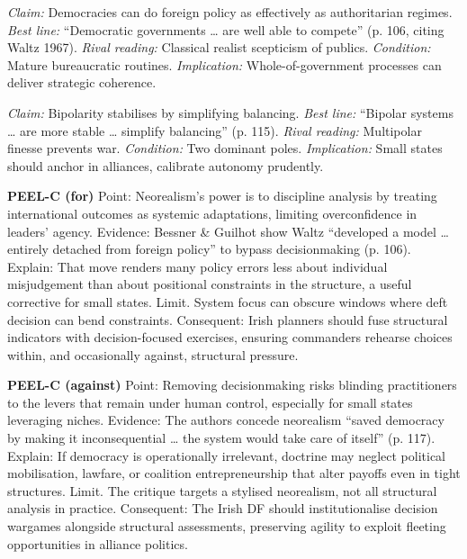 \textit{Claim:} Democracies can do foreign policy as effectively as authoritarian regimes. \textit{Best line:} “Democratic governments … are well able to compete” (p. 106, citing Waltz 1967). \textit{Rival reading:} Classical realist scepticism of publics. \textit{Condition:} Mature bureaucratic routines. \textit{Implication:} Whole-of-government processes can deliver strategic coherence.

\textit{Claim:} Bipolarity stabilises by simplifying balancing. \textit{Best line:} “Bipolar systems … are more stable … simplify balancing” (p. 115). \textit{Rival reading:} Multipolar finesse prevents war. \textit{Condition:} Two dominant poles. \textit{Implication:} Small states should anchor in alliances, calibrate autonomy prudently.

\textbf{PEEL-C (for)}
Point: Neorealism’s power is to discipline analysis by treating international outcomes as systemic adaptations, limiting overconfidence in leaders’ agency.
Evidence: Bessner \& Guilhot show Waltz “developed a model … entirely detached from foreign policy” to bypass decisionmaking (p. 106).
Explain: That move renders many policy errors less about individual misjudgement than about positional constraints in the structure, a useful corrective for small states.
Limit. System focus can obscure windows where deft decision can bend constraints.
Consequent: Irish planners should fuse structural indicators with decision-focused exercises, ensuring commanders rehearse choices within, and occasionally against, structural pressure.

\textbf{PEEL-C (against)}
Point: Removing decisionmaking risks blinding practitioners to the levers that remain under human control, especially for small states leveraging niches.
Evidence: The authors concede neorealism “saved democracy by making it inconsequential … the system would take care of itself” (p. 117).
Explain: If democracy is operationally irrelevant, doctrine may neglect political mobilisation, lawfare, or coalition entrepreneurship that alter payoffs even in tight structures.
Limit. The critique targets a stylised neorealism, not all structural analysis in practice.
Consequent: The Irish DF should institutionalise decision wargames alongside structural assessments, preserving agility to exploit fleeting opportunities in alliance politics.


